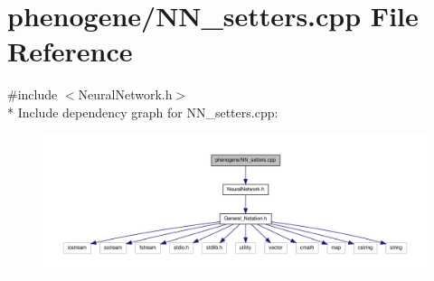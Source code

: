 \hypertarget{a00018}{\section{phenogene/\-N\-N\-\_\-setters.cpp File Reference}
\label{d1/d2b/a00018}
}
{\ttfamily \#include $<$Neural\-Network.\-h$>$}\\*
Include dependency graph for N\-N\-\_\-setters.\-cpp\-:\nopagebreak
\begin{figure}[H]
\begin{center}
\leavevmode
\includegraphics[width=350pt]{db/d3a/a00040}
\end{center}
\end{figure}
